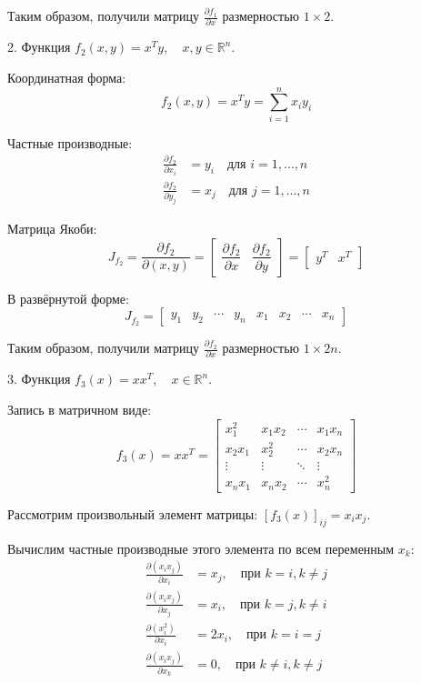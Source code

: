 \documentclass{article}
\begin{document}
Таким образом, получили матрицу \(\frac{\partial f_1}{\partial x}\) размерностью \(1 \times 2\).

\quad

2. Функция \( f_2(x, y) = x^T y, \quad x, y \in \mathbb{R}^n \).

\quad

Координатная форма:
\[
f_2(x, y) = x^T y = \sum_{i=1}^n x_i y_i
\]

Частные производные:
\begin{align*}
\frac{\partial f_2}{\partial x_i} &= y_i \quad \text{для } i = 1, \ldots, n \\
\frac{\partial f_2}{\partial y_j} &= x_j \quad \text{для } j = 1, \ldots, n
\end{align*}

Матрица Якоби:
\[
J_{f_2} = \frac{\partial f_2}{\partial (x, y)} = \begin{bmatrix}
\dfrac{\partial f_2}{\partial x} & \dfrac{\partial f_2}{\partial y}
\end{bmatrix} = \begin{bmatrix} y^T & x^T \end{bmatrix}
\]

В развёрнутой форме:
\[
J_{f_2} = \begin{bmatrix}
y_1 & y_2 & \cdots & y_n & x_1 & x_2 & \cdots & x_n
\end{bmatrix}
\]

Таким образом, получили матрицу \(\frac{\partial f_2}{\partial x}\) размерностью \(1 \times 2n\).

\quad

3. Функция \( f_3(x) = x x^T, \quad x \in \mathbb{R}^n \).

\quad

Запись в матричном виде:
\[
f_3(x) = x x^T = \begin{bmatrix}
x_1^2 & x_1x_2 & \cdots & x_1x_n \\
x_2x_1 & x_2^2 & \cdots & x_2x_n \\
\vdots & \vdots & \ddots & \vdots \\
x_nx_1 & x_nx_2 & \cdots & x_n^2
\end{bmatrix}
\]

Рассмотрим произвольный элемент матрицы: \([f_3(x)]_{ij} = x_i x_j\).

\quad

Вычислим частные производные этого элемента по всем переменным \(x_k\): 
\begin{align*}
\frac{\partial (x_i x_j)}{\partial x_i} &= x_j, \quad \text{при } k = i, k \neq j \\
\frac{\partial (x_i x_j)}{\partial x_j} &= x_i, \quad \text{при } k = j, k \neq i \\
\frac{\partial (x_i^2)}{\partial x_i} &= 2x_i, \quad \text{при } k = i = j \\
\frac{\partial (x_i x_j)}{\partial x_k} &= 0, \quad \text{при } k \neq i, k \neq j
\end{align*}
\end{document}
